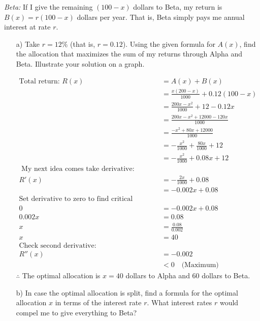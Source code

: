 \documentclass{article}
\newenvironment{solution}{\color{solutioncolor}}{}
\begin{document}
\textit{Beta: } If I give the remaining \( (100-x) \) dollars to Beta, my return is \( B(x) = r(100-x) \) dollars per year. That is, Beta simply pays me annual interest at rate \( r \).
\begin{enumerate}
    \item[a)] Take \( r = 12\% \) (that is, \( r = 0.12 \)). Using the given formula for \( A(x) \), find the allocation that maximizes the sum of my returns through Alpha and Beta. Illustrate your solution on a graph.



    
    \begin{solution}
        \begin{align*}
            \text{Total return: } R(x) &= A(x) + B(x) \\
            &= \frac{x(200-x)}{1000} + 0.12(100-x) \\
            &= \frac{200x - x^2}{1000} + 12 - 0.12x \\
            &= \frac{200x - x^2 + 12000 - 120x}{1000} \\
            &= \frac{-x^2 + 80x + 12000}{1000} \\
            &= -\frac{x^2}{1000} + \frac{80x}{1000} + 12 \\
            &= -\frac{x^2}{1000} + 0.08x + 12 \\
            \text{ My next idea comes take derivative:} \\
            R'(x) &= -\frac{2x}{1000} + 0.08 \\
            &= -0.002x + 0.08 \\
            \text{Set derivative to zero to find critical points:} \\
            0 &= -0.002x + 0.08 \\
            0.002x &= 0.08 \\
            x &= \frac{0.08}{0.002} \\
            x &= 40 \\
            \text{Check second derivative:} \\
            R''(x) &= -0.002 \\
            &< 0 \quad \text{(Maximum)}
        \end{align*}
       $\therefore$ The optimal allocation is \( x = 40 \) dollars to Alpha and \( 60 \) dollars to Beta.
    \end{solution}

    \item[b)] In case the optimal allocation is split, find a formula for the optimal allocation \( x \) in terms of the interest rate \( r \). What interest rates \( r \) would compel me to give everything to Beta?


\end{enumerate}
\end{document}
